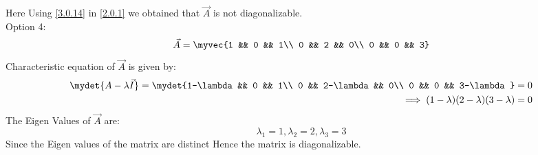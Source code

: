 \documentclass[journal,12pt,twocolumn]{IEEEtran}
\begin{document}
Here Using \eqref{3.0.14} in \eqref{2.0.1} we obtained that $\vec{A}$ is not diagonalizable.\\
Option 4:
\begin{equation*}
\vec{A} = \myvec{1 && 0 && 1\\ 0 && 2 && 0\\ 0 && 0 && 3}
\end{equation*}
Characteristic equation of $\vec{A}$ is given by:
\begin{equation} \label{3.0.15}
\begin{split}
\mydet{A-\lambda \vec{I}}=\mydet{1-\lambda && 0 && 1\\ 0 && 2-\lambda && 0\\ 0 && 0 && 3-\lambda} = 0\\
\implies (1-\lambda)(2-\lambda)(3-\lambda) = 0
\end{split}
\end{equation}
The Eigen Values of $\vec{A}$ are:
\begin{equation} \label{3.0.16}
\lambda_1 = 1, \lambda_2 = 2, \lambda_3 = 3
\end{equation}
Since the Eigen values of the matrix are distinct Hence the matrix is diagonalizable.
\end{document}
